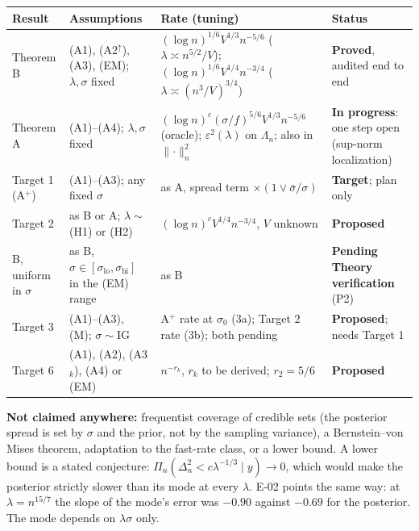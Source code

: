 \documentclass[11pt]{article}
\newcommand{\norm}[1]{\lVert #1\rVert}
\newcommand{\sbar}{\bar\sigma}
\newcommand{\Post}{\Pi_n}
\theoremstyle{plain}
\theoremstyle{definition}
\theoremstyle{remark}
\begin{document}
\begin{center}\small
{}
\label{tab:summary}
\begin{tabular}{@{}p{2.3cm}p{3.6cm}p{4.6cm}p{3.6cm}@{}}
\toprule
Result & Assumptions & Rate (tuning) & Status \\
\midrule
Theorem B & (A1), (A2$^\uparrow$), (A3), (EM); $\lambda,\sigma$ fixed & $(\log n)^{1/6}V^{1/3}n^{-5/6}$ ($\lambda\asymp n^{5/2}/V$); $(\log n)^{1/6}V^{1/4}n^{-3/4}$ ($\lambda\asymp(n^3/V)^{3/4}$) & \textcolor{proved}{\textbf{Proved}}, audited end to end \\[2pt]
Theorem A & (A1)--(A4); $\lambda,\sigma$ fixed & $(\log n)^c(\sigma/f)^{5/6}V^{1/3}n^{-5/6}$ (oracle); $\varepsilon^2(\lambda)$ on $\Lambda_n$; also in $\norm{\cdot}_n^2$ & \textcolor{progress}{\textbf{In progress}}: one step open (sup-norm localization) \\[2pt]
Target 1 (A$^+$) & (A1)--(A3); any fixed $\sigma$ & as A, spread term $\times(1\vee\sbar/\sigma)$ & \textcolor{target}{\textbf{Target}}; plan only \\[2pt]
Target 2 & as B or A; $\lambda\sim$ (H1) or (H2) & $(\log n)^cV^{1/4}n^{-3/4}$, $V$ unknown & \textcolor{proposed}{\textbf{Proposed}} \\[2pt]
B, uniform in $\sigma$ & as B, $\sigma\in[\sigma_{\mathrm{lo}},\sigma_{\mathrm{hi}}]$ in the (EM) range & as B & \textcolor{progress}{\textbf{Pending Theory verification}} (P2) \\[2pt]
Target 3 & (A1)--(A3), (M); $\sigma\sim\mathrm{IG}$ & A$^+$ rate at $\sigma_0$ (3a); Target 2 rate (3b); both pending & \textcolor{proposed}{\textbf{Proposed}}; needs Target 1 \\[2pt]
Target 6 & (A1), (A2), (A3$_k$), (A4) or (EM) & $n^{-r_k}$, $r_k$ to be derived; $r_2=5/6$ & \textcolor{proposed}{\textbf{Proposed}} \\
\bottomrule
\end{tabular}
\end{center}

\noindent\textbf{Not claimed anywhere:} frequentist coverage of credible sets (the posterior spread is set by $\sigma$ and the prior, not by the sampling variance), a Bernstein--von Mises theorem, adaptation to the fast-rate class, or a lower bound. A lower bound is a stated conjecture: $\Post(\Delta_n^2<c\lambda^{-1/3}\mid y)\to0$, which would make the posterior strictly slower than its mode at every $\lambda$. E-02 points the same way: at $\lambda=n^{15/7}$ the slope of the mode's error was $-0.90$ against $-0.69$ for the posterior. The mode depends on $\lambda\sigma$ only.
\end{document}
